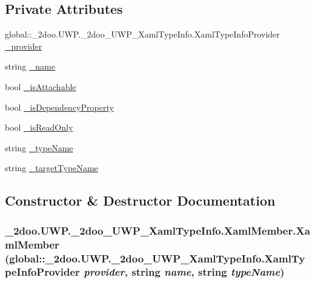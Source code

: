 \subsection*{Private Attributes}
\begin{CompactItemize}
\item 
global::\_\-2doo.UWP.\_\-2doo\_\-UWP\_\-XamlTypeInfo.XamlTypeInfoProvider \hyperlink{class__2doo_1_1_u_w_p_1_1__2doo___u_w_p___xaml_type_info_1_1_xaml_member_f0cf129e5c5ae992760285463565f5b5}{\_\-provider}
\item 
string \hyperlink{class__2doo_1_1_u_w_p_1_1__2doo___u_w_p___xaml_type_info_1_1_xaml_member_900043a9c63450d5627a653fa50c32fd}{\_\-name}
\item 
bool \hyperlink{class__2doo_1_1_u_w_p_1_1__2doo___u_w_p___xaml_type_info_1_1_xaml_member_e65787109334c3efec2302a65cc0f6c0}{\_\-isAttachable}
\item 
bool \hyperlink{class__2doo_1_1_u_w_p_1_1__2doo___u_w_p___xaml_type_info_1_1_xaml_member_d13c358a49ce7afd59e8280a57b72292}{\_\-isDependencyProperty}
\item 
bool \hyperlink{class__2doo_1_1_u_w_p_1_1__2doo___u_w_p___xaml_type_info_1_1_xaml_member_981134e632e4784fe21bd231ec3ab132}{\_\-isReadOnly}
\item 
string \hyperlink{class__2doo_1_1_u_w_p_1_1__2doo___u_w_p___xaml_type_info_1_1_xaml_member_3dc3ca03848a599236de43ef15ba7937}{\_\-typeName}
\item 
string \hyperlink{class__2doo_1_1_u_w_p_1_1__2doo___u_w_p___xaml_type_info_1_1_xaml_member_25c20e2cdb9bb0ab4093cb539d062d5b}{\_\-targetTypeName}
\end{CompactItemize}


\subsection{Constructor \& Destructor Documentation}
\hypertarget{class__2doo_1_1_u_w_p_1_1__2doo___u_w_p___xaml_type_info_1_1_xaml_member_4cd29cbfc8aef63ab59db87059cfba78}{
\subsubsection[{XamlMember}]{\setlength{\rightskip}{0pt plus 5cm}\_\-2doo.UWP.\_\-2doo\_\-UWP\_\-XamlTypeInfo.XamlMember.XamlMember (global::\_\-2doo.UWP.\_\-2doo\_\-UWP\_\-XamlTypeInfo.XamlTypeInfoProvider {\em provider}, \/  string {\em name}, \/  string {\em typeName})}}
\label{class__2doo_1_1_u_w_p_1_1__2doo___u_w_p___xaml_type_info_1_1_xaml_member_4cd29cbfc8aef63ab59db87059cfba78}




